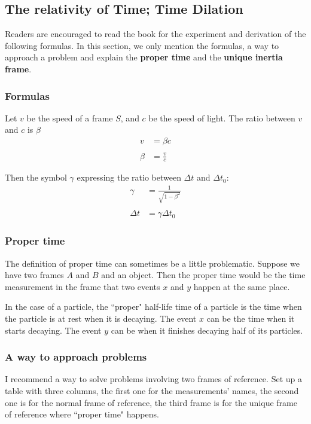 \subsection{The relativity of Time; Time Dilation}
Readers are encouraged to  read the book for the experiment and derivation of the following formulas. In this section, we only mention the formulas, a way to approach a problem and explain the \textbf{proper time} and the \textbf{unique inertia frame}.

\subsubsection{Formulas}

Let $v$ be the speed of a frame $S$, and $c$ be the speed of light. The ratio between $v$ and $c$ is $\beta$
\begin{align*}
    v &= \beta c \\ \\
    \beta &= \frac{v}{c}
\end{align*}

Then the symbol $\gamma$ expressing the ratio between $\Delta t$ and $\Delta t_0$:
\begin{align*}
    \gamma &= \frac{1}{\sqrt{1-\beta^2}} \\\\
     \Delta t &= \gamma \Delta t_0
\end{align*}

\subsubsection{Proper time}

The definition of proper time can sometimes be a little problematic. Suppose we have two frames $A$ and $B$ and an object. Then the proper time would be the time measurement in the frame that two events $x$ and $y$ happen at the same place. 

\begin{ex}
    In the case of a particle, the ``proper" half-life time of a particle is the time when the particle is at rest when it is decaying. The event $x$ can be the time when it starts decaying. The event $y$ can be when it finishes decaying half of its particles.
\end{ex}

\subsubsection{A way to approach problems}
I recommend a way to solve problems involving two frames of reference. Set up a table with three columns, the first one for the measurements' names, the second one is for the normal frame of reference, the third frame is for the unique frame of reference where ``proper time" happens.